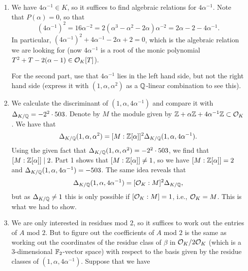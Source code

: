 \documentclass[a4paper,11pt]{article}
\begin{document}
\begin{enumerate}[labelindent=0pt, wide]
    \item We have $4\alpha^{-1} \in K$, so it suffices to find algebraic relations
        for $4\alpha^{-1}$.
        Note that $P(\alpha) = 0$, so that
        \begin{equation*}
            (4 \alpha^{-1})^2 = 16 \alpha^{-2} = 
            2(\alpha^3 - \alpha^2 - 2\alpha) \alpha^{-2} = 2\alpha - 2 -
            4 \alpha^{-1}.
        \end{equation*}
        In particular, $(4 \alpha^{-1})^2 + 4 \alpha^{-1} - 2\alpha + 2 = 0$,
        which is the algebraic relation we are looking for (now
        $4\alpha^{-1}$ is a root of the monic polynomial 
        $T^2 + T - 2(\alpha - 1) \in \mathcal{O}_K[T]$).

        For the second part, use that $4\alpha^{-1}$ lies in the left hand
        side, but not the right hand side (express it with $(1, \alpha, \alpha^2)$
        as a $\mathbb{Q}$-linear combination to see this). 
    \item We calculate the discriminant of $(1, \alpha, 4\alpha^{-1})$ and
        compare it with $\Delta_{K/\mathbb{Q}} = -2^2\cdot 503$.
        Denote by $M$ the module given by $\mathbb{Z} + \alpha \mathbb{Z} + 4\alpha^{-1} \mathbb{Z}
        \subset \mathcal{O}_K$. We have that 
        $$\Delta_{K/\mathbb{Q}}(1, \alpha, \alpha^2) = [M:\mathbb{Z}[\alpha]]^2 \Delta_{K/\mathbb{Q}}(
        1, \alpha, 4\alpha^{-1}).$$
        Using the given fact that $\Delta_{K/\mathbb{Q}}(1, \alpha, \alpha^2) = 
        -2^2\cdot 503$, we find that $[M:\mathbb{Z}[\alpha]] \mid 2$. Part 1 shows that
        $[M:\mathbb{Z}[\alpha]] \neq 1$, so we have $[M:\mathbb{Z}[\alpha]] = 2$ and
        $\Delta_{K/\mathbb{Q}}(1, \alpha, 4\alpha^{-1}) = -503$.
        The same idea reveals that 
        \begin{equation*}
            \Delta_{K/\mathbb{Q}}(1, \alpha, 4\alpha^{-1}) = [\mathcal{O}_K:M]^2 \Delta_{K/\mathbb{Q}},
        \end{equation*}
        but as $\Delta_{K/\mathbb{Q}}\neq 1$ this is only possible if $[\mathcal{O}_K:M]=1$,
        i.e., $\mathcal{O}_K = M$. This is what we had to show.
    \item We are only interested in residues mod $2$, so it suffices to work out
        the entries of $A$ mod $2$. But to figure out the coefficients of $A$
        mod $2$ is the same as working out the coordinates of the residue class
        of $\beta$ in $\mathcal{O}_K/2\mathcal{O}_K$ (which is a $3$-dimensional $\mathbb{F}_2$-vector
        space) with respect to the basis given by the residue classes of 
        $(1, \alpha, 4\alpha^{-1})$.
        Suppose that we have

\end{enumerate}
\end{document}

